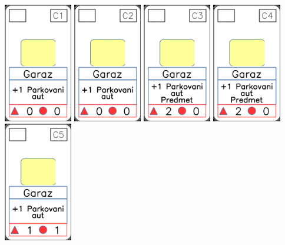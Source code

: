 \documentclass[a4paper]{article}
\begin{document}
	\includegraphics[width=3.0cm]{img-1_10}
	\includegraphics[width=3.0cm]{img-1_11}
	\includegraphics[width=3.0cm]{img-1_12}
	\includegraphics[width=3.0cm]{img-1_13}
	\includegraphics[width=3.0cm]{img-1_14}
\end{document}
